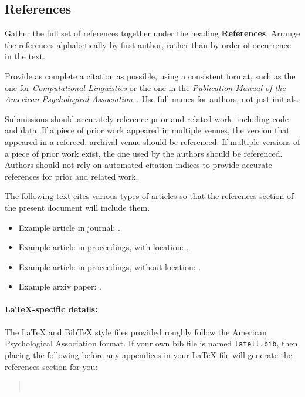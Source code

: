 \documentclass[11pt,a4paper]{article}
\begin{document}
\subsection{References}
Gather the full set of references together under the heading \textbf{References}.
Arrange the references alphabetically by first author, rather than by order of occurrence in the text.

Provide as complete a citation as possible, using a consistent format, such as the one for \emph{Computational Linguistics\/} or the one in the  \emph{Publication Manual of the American 
Psychological Association\/}~\citep{APA:83}.
Use full names for authors, not just initials.

Submissions should accurately reference prior and related work, including code and data.
If a piece of prior work appeared in multiple venues, the version that appeared in a refereed, archival venue should be referenced.
If multiple versions of a piece of prior work exist, the one used by the authors should be referenced.
Authors should not rely on automated citation indices to provide accurate references for prior and related work.

The following text cites various types of articles so that the references section of the present document will include them.
\begin{itemize}
\item Example article in journal: \citep{Ando2005}.
\item Example article in proceedings, with location: \citep{borschinger-johnson-2011-particle}.
\item Example article in proceedings, without location: \citep{andrew2007scalable}.
\item Example arxiv paper: \citep{rasooli-tetrault-2015}. 
\end{itemize}


\paragraph{\LaTeX-specific details:}
The \LaTeX{} and Bib\TeX{} style files provided roughly follow the American Psychological Association format.
If your own bib file is named \texttt{\small latell.bib}, then placing the following before any appendices in your \LaTeX{}  file will generate the references section for you:
\begin{quote}\small
\verb||\\
\verb||
\end{quote}
\end{document}
